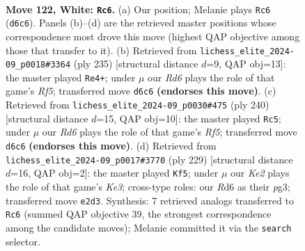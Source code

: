 \documentclass[11pt]{article}
\begin{document}
\clearpage

\begin{figure}[p]\centering
\begin{subfigure}{0.46\textwidth}\centering
\resizebox{\linewidth}{!}{%
\newchessgame
\chessboard[
  setfen={1k6/4r3/3Rp3/4P3/5P1R/8/4K3/8 w - - 29 122},
  showmover=false,
  pgfstyle=straightmove, color=movearrow, markmove={d6-c6}
]}
\caption{}
\end{subfigure}\hfill
\begin{subfigure}{0.46\textwidth}\centering
\resizebox{\linewidth}{!}{%
\newchessgame
\chessboard[
  setfen={8/7k/6p1/7p/5r1P/8/4K3/7R b - - 97 118},
  showmover=false,
  pgfstyle=straightmove, color=movearrow, markmove={f4-e4}
]}
\caption{}
\end{subfigure}
\\[4pt]
\begin{subfigure}{0.46\textwidth}\centering
\resizebox{\linewidth}{!}{%
\newchessgame
\chessboard[
  setfen={8/8/7k/5R1p/7P/6P1/6K1/r7 w - - 87 121},
  showmover=false,
  pgfstyle=straightmove, color=movearrow, markmove={f5-c5}
]}
\caption{}
\end{subfigure}\hfill
\begin{subfigure}{0.46\textwidth}\centering
\resizebox{\linewidth}{!}{%
\newchessgame
\chessboard[
  setfen={8/r7/4k1p1/7p/7P/4R1P1/8/6K1 b - - 67 115},
  showmover=false,
  pgfstyle=straightmove, color=movearrow, markmove={e6-f5}
]}
\caption{}
\end{subfigure}
\caption{\textbf{Move 122, White: \texttt{Rc6}.} (a) Our position; Melanie plays \texttt{Rc6} (\texttt{d6c6}). Panels (b)--(d) are the retrieved master positions whose correspondence most drove this move (highest QAP objective among those that transfer to it). (b) Retrieved from \texttt{lichess\_elite\_2024-09\_p0018\#3364} (ply 235) [structural distance $d$=9, QAP obj=13]: the master played \texttt{Re4+}; under $\mu$ our \emph{Rd6} plays the role of that game's \emph{Rf5}; transferred move \texttt{d6c6} \textbf{(endorses this move)}. (c) Retrieved from \texttt{lichess\_elite\_2024-09\_p0030\#475} (ply 240) [structural distance $d$=15, QAP obj=10]: the master played \texttt{Rc5}; under $\mu$ our \emph{Rd6} plays the role of that game's \emph{Rf5}; transferred move \texttt{d6c6} \textbf{(endorses this move)}. (d) Retrieved from \texttt{lichess\_elite\_2024-09\_p0017\#3770} (ply 229) [structural distance $d$=16, QAP obj=2]: the master played \texttt{Kf5}; under $\mu$ our \emph{Ke2} plays the role of that game's \emph{Ke3}; cross-type roles: our \emph{R}d6 as their \emph{p}g3; transferred move \texttt{e2d3}. Synthesis: 7 retrieved analogs transferred to \texttt{Rc6} (summed QAP objective 39, the strongest correspondence among the candidate moves); Melanie committed it via the \texttt{search} selector.}
\label{fig:thought-m242}
\end{figure}
\end{document}
